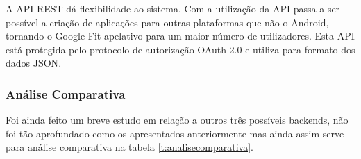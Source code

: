 A \gls{API} \gls{REST} dá flexibilidade ao sistema. Com a utilização da \gls{API} passa a ser possível a criação de aplicações para outras plataformas que não o Android, tornando o Google Fit apelativo para um maior número de utilizadores. Esta \gls{API} está protegida pelo protocolo de autorização OAuth 2.0 e utiliza para formato dos dados \gls{JSON}\cite{googlegetstarted}. 

\subsubsection{Análise Comparativa}

Foi ainda feito um breve estudo em relação a outros três possíveis backends, não foi tão aprofundado como os apresentados anteriormente mas ainda assim serve para análise comparativa na tabela \ref{t:analisecomparativa}.
